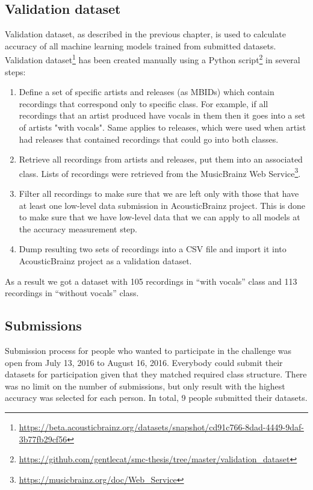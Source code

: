 \subsection{Validation dataset}

Validation dataset, as described in the previous chapter, is used to calculate accuracy of all machine learning models trained from submitted datasets. Validation dataset\footnote{\url{https://beta.acousticbrainz.org/datasets/snapshot/cd91c766-8dad-4449-9daf-3b77fb29cf56}} has been created manually using a Python script\footnote{\url{https://github.com/gentlecat/smc-thesis/tree/master/validation_dataset}} in several steps:
\begin{enumerate}
    \item Define a set of specific artists and releases (as MBIDs) which contain recordings that correspond only to specific class. For example, if all recordings that an artist produced have vocals in them then it goes into a set of artists "with vocals". Same applies to releases, which were used when artist had releases that contained recordings that could go into both classes.
    \item Retrieve all recordings from artists and releases, put them into an associated class. Lists of recordings were retrieved from the MusicBrainz Web Service\footnote{\url{https://musicbrainz.org/doc/Web_Service}}.
    \item Filter all recordings to make sure that we are left only with those that have at least one low-level data submission in AcousticBrainz project. This is done to make sure that we have low-level data that we can apply to all models at the accuracy measurement step.
    \item Dump resulting two sets of recordings into a CSV file and import it into AcousticBrainz project as a validation dataset.
\end{enumerate}

As a result we got a dataset with 105 recordings in ``with vocals'' class and 113 recordings in ``without vocals'' class.

\subsection{Submissions}

Submission process for people who wanted to participate in the challenge was open from July 13, 2016 to August 16, 2016. Everybody could submit their datasets for participation given that they matched required class structure. There was no limit on the number of submissions, but only result with the highest accuracy was selected for each person. In total, 9 people submitted their datasets.

